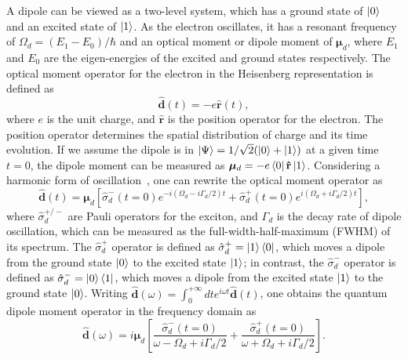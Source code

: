 A dipole can be viewed as a two-level system, which has a ground state of $\mathinner{|{0}\rangle}$ and an excited state of $\mathinner{|{1}\rangle}$. As the electron oscillates, it has a resonant frequency of $\Omega_d=(E_1-E_0)/\hbar$ and an optical moment or dipole moment of ${\bm\mu_d}$, where $E_1$ and $E_0$ are the eigen-energies of the excited and ground states respectively. The optical moment operator for the electron in the Heisenberg representation is defined as
\begin{equation}
\mathbf{\hat{d}}(t)=-e\mathbf{\hat{r}}(t),\label{eq:dt1}
\end{equation}
where $e$ is the unit charge, and $\mathbf{\hat{r}}$ is the position operator for the electron. The position operator determines the spatial distribution of charge and its time evolution. If we assume the dipole is in $\mathinner{|{\Psi}\rangle}=1/\sqrt{2}(\mathinner{|{0}\rangle}+\mathinner{|{1}\rangle})$ at a given time $t=0$, the dipole moment can be measured as ${\bm\mu_d}=-e\mathinner{\langle{0}|}\mathbf{\hat{r}}\mathinner{|{1}\rangle}$.  Considering a harmonic form of oscillation~\cite{Gerry2005,Mahan2000}, one can rewrite the optical moment operator as
\begin{equation}
\mathbf{\hat{d}}(t)={\bm\mu_d}[\hat{\sigma}_d^-(t=0) e^{-i(\Omega_d-i\Gamma_d/2) t} +\hat{\sigma}_d^+(t=0)e^{i(\Omega_d+i\Gamma_d/2) t}],\label{eq:dt2}
\end{equation}
where $\hat{\sigma}^{+/-}_d$ are Pauli operators for the exciton, and $\Gamma_d$ is the decay rate of dipole oscillation, which can be measured as the full-width-half-maximum (FWHM) of its spectrum. The $\hat{\sigma}^{+}_d$ operator is defined as $\hat{\sigma}^{+}_d=\mathinner{|{1}\rangle}\mathinner{\langle{0}|}$, which moves a dipole from the ground state $\mathinner{|{0}\rangle}$ to the excited state $\mathinner{|{1}\rangle}$; in contrast, the $\hat{\sigma}^{-}_d$ operator is defined as $\hat{\sigma}^{-}_d=\mathinner{|{0}\rangle}\mathinner{\langle{1}|}$, which moves a dipole from the excited state $\mathinner{|{1}\rangle}$ to the ground state $\mathinner{|{0}\rangle}$. Writing $\mathbf{\hat{d}}(\omega)=\int_{0}^{+\infty}{dt e^{i\omega t}\mathbf{\hat{d}}(t)}$, one obtains the quantum dipole moment operator in the frequency domain as
\begin{equation}
 \label{dipole}
  \mathbf{\hat{d}}(\omega) =
{i\bm\mu_d}\left [ \frac{\hat{\sigma}_d^-(t=0)}
{\omega-\Omega_d+i\Gamma_d/2}+\frac{\hat{\sigma}_d^+(t=0)}{\omega+\Omega_d+i\Gamma_d/2}\right ].
\end{equation}

